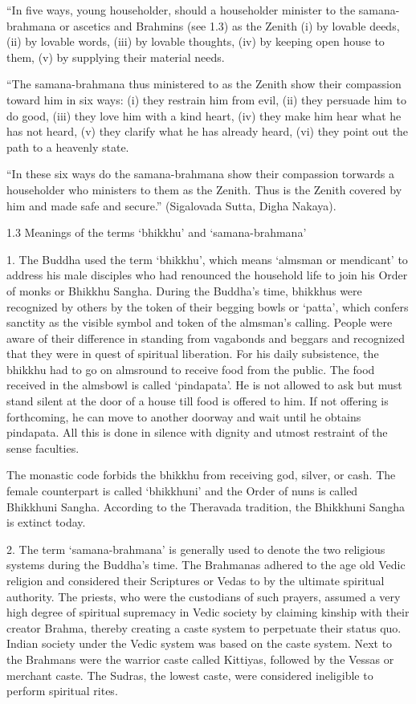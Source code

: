 “In five ways, young householder, should a householder minister to the samana-brahmana or ascetics and Brahmins (see 1.3) as the Zenith (i) by lovable deeds, (ii) by lovable words, (iii) by lovable thoughts, (iv) by keeping open house to them, (v) by supplying their material needs.

“The samana-brahmana thus ministered to as the Zenith show their compassion toward him in six ways: (i) they restrain him from evil, (ii) they persuade him to do good, (iii) they love him with a kind heart, (iv) they make him hear what he has not heard, (v) they clarify what he has already heard, (vi) they point out the path to a heavenly state.

“In these six ways do the samana-brahmana show their compassion torwards a householder who ministers to them as the Zenith. Thus is the Zenith covered by him and made safe and secure.” (Sigalovada Sutta, Digha Nakaya).

1.3 Meanings of the terms ‘bhikkhu’ and ‘samana-brahmana’

1. The Buddha used the term ‘bhikkhu’, which means ‘almsman or mendicant’ to address his male disciples who had renounced the household life to join his Order of monks or Bhikkhu Sangha. During the Buddha’s time, bhikkhus were recognized by others by the token of their begging bowls or ‘patta’, which confers sanctity as the visible symbol and token of the almsman’s calling. People were aware of their difference in standing from vagabonds and beggars and recognized that they were in quest of spiritual liberation. For his daily subsistence, the bhikkhu had to go on almsround to receive food from the public. The food received in the almsbowl is called ‘pindapata’. He is not allowed to ask but must stand silent at the door of a house till food is offered to him. If not offering is forthcoming, he can move to another doorway and wait until he obtains pindapata. All this is done in silence with dignity and utmost restraint of the sense faculties.

The monastic code forbids the bhikkhu from receiving god, silver, or cash. The female counterpart is called ‘bhikkhuni’ and the Order of nuns is called Bhikkhuni Sangha. According to the Theravada tradition, the Bhikkhuni Sangha is extinct today.

2. The term ‘samana-brahmana’ is generally used to denote the two religious systems during the Buddha’s time. The Brahmanas adhered to the age old Vedic religion and considered their Scriptures or Vedas to by the ultimate spiritual authority. The priests, who were the custodians of such prayers, assumed a very high degree of spiritual supremacy in Vedic society by claiming kinship with their creator Brahma, thereby creating a caste system to perpetuate their status quo. Indian society under the Vedic system was based on the caste system. Next to the Brahmans were the warrior caste called Kittiyas, followed by the Vessas or merchant caste. The Sudras, the lowest caste, were considered ineligible to perform spiritual rites.

